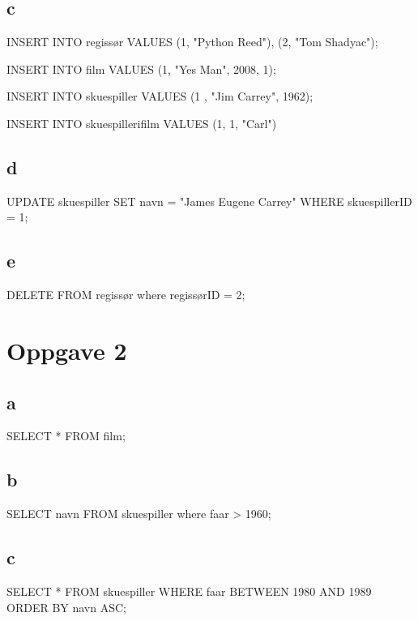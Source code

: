 \documentclass[12pt,a4paper]{article}
\begin{document}
	\subsection{c}
	\begin{spverbatim}	
INSERT INTO regissør VALUES (1, "Python Reed"), (2, "Tom Shadyac");

INSERT INTO film VALUES (1, "Yes Man", 2008, 1);

INSERT INTO skuespiller VALUES (1 , "Jim Carrey", 1962);

INSERT INTO skuespillerifilm VALUES (1, 1, "Carl")	
	\end{spverbatim}
	
	\subsection{d}
	\begin{spverbatim}
UPDATE skuespiller SET navn = "James Eugene Carrey" WHERE skuespillerID = 1;
	\end{spverbatim}	
	
	\subsection{e}
	\begin{spverbatim}
DELETE FROM regissør where regissørID = 2;
	\end{spverbatim}	
	
	\section{Oppgave 2}
	\subsection{a}
	\begin{spverbatim}
SELECT * FROM film;
	\end{spverbatim}	
	
	\subsection{b}
	\begin{spverbatim}
SELECT navn FROM skuespiller where faar > 1960;
	\end{spverbatim}	
	
	\subsection{c}
	\begin{spverbatim}
SELECT * FROM skuespiller WHERE faar BETWEEN 1980 AND 1989 ORDER BY navn ASC;
	\end{spverbatim}	
	
\end{document}
